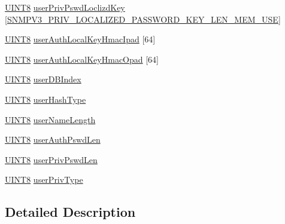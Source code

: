 \begin{DoxyCompactItemize}
\hyperlink{_generic_type_defs_8h_ab27e9918b538ce9d8ca692479b375b6a}{U\+I\+N\+T8} \hyperlink{structsnmp_v3_engn_user_data_base_adf7a9f490d187c5382c13a36df9d3943}{user\+Priv\+Pswd\+Loclizd\+Key} \mbox{[}\hyperlink{_s_n_m_pv3_8h_ac4f6c565b2b60abb96d01052e1bbb60e}{S\+N\+M\+P\+V3\+\_\+\+P\+R\+I\+V\+\_\+\+L\+O\+C\+A\+L\+I\+Z\+E\+D\+\_\+\+P\+A\+S\+S\+W\+O\+R\+D\+\_\+\+K\+E\+Y\+\_\+\+L\+E\+N\+\_\+\+M\+E\+M\+\_\+\+U\+S\+E}\mbox{]}
\item 
\hyperlink{_generic_type_defs_8h_ab27e9918b538ce9d8ca692479b375b6a}{U\+I\+N\+T8} \hyperlink{structsnmp_v3_engn_user_data_base_af6bd5682686297a281e89bba106fc8b1}{user\+Auth\+Local\+Key\+Hmac\+Ipad} \mbox{[}64\mbox{]}
\item 
\hyperlink{_generic_type_defs_8h_ab27e9918b538ce9d8ca692479b375b6a}{U\+I\+N\+T8} \hyperlink{structsnmp_v3_engn_user_data_base_a31916d88356f62b926bb287da6c0a41b}{user\+Auth\+Local\+Key\+Hmac\+Opad} \mbox{[}64\mbox{]}
\item 
\hyperlink{_generic_type_defs_8h_ab27e9918b538ce9d8ca692479b375b6a}{U\+I\+N\+T8} \hyperlink{structsnmp_v3_engn_user_data_base_aaf9a90ce9f4db0bf164bacba8b3d2050}{user\+D\+B\+Index}
\item 
\hyperlink{_generic_type_defs_8h_ab27e9918b538ce9d8ca692479b375b6a}{U\+I\+N\+T8} \hyperlink{structsnmp_v3_engn_user_data_base_adfb568ee2aff9a1a79c52c4380e2ee56}{user\+Hash\+Type}
\item 
\hyperlink{_generic_type_defs_8h_ab27e9918b538ce9d8ca692479b375b6a}{U\+I\+N\+T8} \hyperlink{structsnmp_v3_engn_user_data_base_a0649f84a5ef5e02d42008b3e783b6a18}{user\+Name\+Length}
\item 
\hyperlink{_generic_type_defs_8h_ab27e9918b538ce9d8ca692479b375b6a}{U\+I\+N\+T8} \hyperlink{structsnmp_v3_engn_user_data_base_a8d11ae416088dbf326284099f19cf5b8}{user\+Auth\+Pswd\+Len}
\item 
\hyperlink{_generic_type_defs_8h_ab27e9918b538ce9d8ca692479b375b6a}{U\+I\+N\+T8} \hyperlink{structsnmp_v3_engn_user_data_base_afa91ea7d942d37e26e5f0d427d5d5da1}{user\+Priv\+Pswd\+Len}
\item 
\hyperlink{_generic_type_defs_8h_ab27e9918b538ce9d8ca692479b375b6a}{U\+I\+N\+T8} \hyperlink{structsnmp_v3_engn_user_data_base_a7494f0bbde28857f7065875edbe3d612}{user\+Priv\+Type}
\end{DoxyCompactItemize}


\subsection{Detailed Description}


